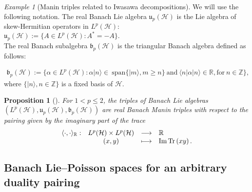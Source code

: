 \documentclass[a4paper,12pt,reqno]{amsart}%
\newtheorem{proposition}[theorem]{Proposition}
\theoremstyle{definition}
\theoremstyle{remark}
\newtheorem{example}[theorem]{Example}
\numberwithin{theorem}{section}
\numberwithin{equation}{section}
\newcommand{\1}{{\bf 1}}
\DeclareMathOperator{\Tr}{\textnormal{Tr}}
\DeclareMathOperator{\im}{\textnormal{Im}}
\begin{document}
\begin{example}[Manin triples related to Iwasawa decompositions]\label{exIwasawa}
We will use the following notation.
The real Banach Lie algebra $\mathfrak{u}_{p}(\mathcal{H})$ is the Lie algebra of skew-Hermitian operators in $L^p(\mathcal{H})$:
\begin{equation}\label{u2}
\mathfrak{u}_p(\mathcal{H}) := \{A\in L^{p}(\mathcal H): A^* = -A\}.\quad\quad\quad\quad\quad\quad\quad\quad\quad\quad\quad\quad\quad\quad\quad\quad\quad\quad\quad
\end{equation} 
The real Banach subalgebra $\mathfrak{b}_p(\mathcal{H})$ 
is the triangular Banach algebra defined as follows: 

\begin{equation}\label{b2pm}
\begin{array}{l}
\mathfrak{b}_p(\mathcal{H}) := \{\alpha\in L^p(\mathcal{H}): \alpha |n\rangle \in~ \textrm{span}\{|m\rangle, m\geq n\}~\textrm{and}~\langle n|\alpha|n\rangle\in\mathbb{R}, \textrm{for}~ n\in\mathbb{Z}\},
\end{array}
\end{equation}
where $\{|n\rangle, n\in\mathbb{Z}\}$ is a fixed basis of $\mathcal{H}$.
\begin{proposition}[{\cite[Proposition~1.16]{tumpach-bruhat}}]\label{triples}
For $1<p\leq 2$, the triples of Banach Lie algebras $(L^p(\mathcal{H}), \mathfrak{u}_{p}(\mathcal{H}), \mathfrak{b}_p(\mathcal{H}))$ 
are real Banach Manin triples with respect to the pairing given by the imaginary part of the trace
\begin{equation}\label{imparttrace}
\begin{array}{lcll}
\langle\cdot,\cdot\rangle_{\mathbb{R}}: &L^p(\mathcal{H})\times L^p(\mathcal{H})& \longrightarrow &\mathbb{R}\\
& (x, y) & \longmapsto & \im \Tr\left(x y\right).
\end{array}
\end{equation}
\end{proposition}
\end{example}



\subsection{Banach Lie--Poisson spaces for an arbitrary duality pairing}
\end{document}
